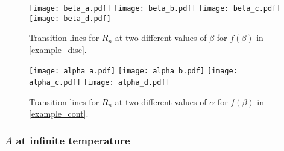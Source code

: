 \documentclass[a4paper,11pt]{article}
\newcommand\sZ{{\mathcal Z}}
\begin{document}
\begin{enumerate}
\begin{figure}[] 
\texttt{[image: beta\_a.pdf]} 
\texttt{[image: beta\_b.pdf]} 
\texttt{[image: beta\_c.pdf]} 
\texttt{[image: beta\_d.pdf]} 
\caption{Transition lines for $R_n$ at two different values of $\beta$ for $f(\beta)$ in \eqref{example_disc}.} 
\label{fig:n_disc}
\end{figure} 

\begin{figure}[] 
\texttt{[image: alpha\_a.pdf]} 
\texttt{[image: alpha\_b.pdf]} 
\texttt{[image: alpha\_c.pdf]} 
\texttt{[image: alpha\_d.pdf]} 
\caption{Transition lines for $R_n$ at two different values of $\alpha$ for $f(\beta)$ in \eqref{example_cont}.} 
\label{fig:n_cont}
\end{figure} 






\iffalse
In the shaded yellow, green and purple regions, the Renyi negativities and $\sZ_n^{(PT)}$ for all even $n\geq 2$ are given by the expressions in \eqref{fin_un}, \eqref{fin_me2} and \eqref{fin_es} respectively, \textcolor{red}{so that we can unambiguously analytically continue to get Renyi negativities given by \eqref{neg_unen}, \eqref{neg_max_finite} and \eqref{neg_es} respectively. [this is no longer clear, as in cases where the transitions are $n$-dependent, the transition for $n=1$ can be different from all other $n$. In particular, we need to be careful with the transition to the ME phase in Fig.~\ref{fig:even_n_disc}].} These are the finite-temperature analogs of the unentangled, maximally entangled, and entanglement saturation phases. In the unshaded regions, $\sZ_n^{(PT)}$ and $R_n$ are not $n$-independent, although in the white region below the red lines, the $R_n$ for even $n\geq 4$ all have the same expression \eqref{rn_ppt2}. The black lines in each of the diagrams correspond to the entanglement phase diagram obtained in terms of the mutual information, which also coincides with the infinite-temperature phase diagram in terms of both the negativity and the mutual information. \textcolor{red}{add plot showing Renyi negativity along vertical and horizontal lines}
\fi
 

\subsubsection{$A$ at infinite temperature} \label{sec:Binf} 


\end{enumerate}
\end{document}
